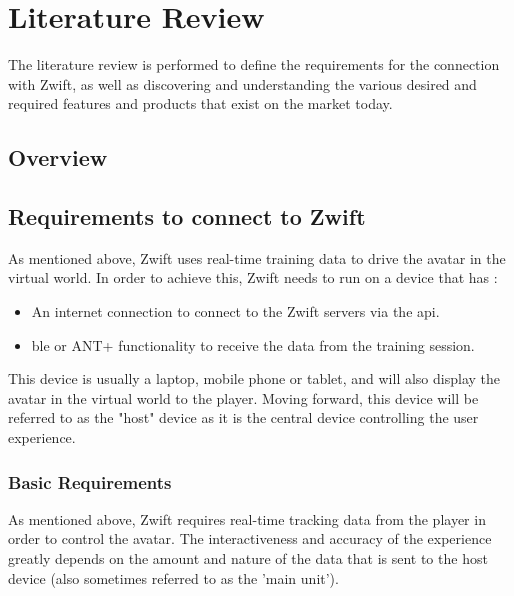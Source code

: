 
\chapter{Literature Review}
The literature review is performed to define the requirements for the connection with Zwift, as well as discovering and understanding the various desired and required features and products that exist on the market today.

\section{Overview}

\newpage

\section{Requirements to connect to Zwift}
As mentioned above, Zwift uses real-time training data to drive the avatar in the virtual world. In order to achieve this, Zwift needs to run on a device that has :

\begin{itemize}
	\item An internet connection to connect to the Zwift servers via the \ac{api}.
	\item \ac{ble} or ANT+ functionality to receive the data from the training session.
\end{itemize}

This device is usually a laptop, mobile phone or tablet, and will also display the avatar in the virtual world to the player. Moving forward, this device will be referred to as the "host" device as it is the central device controlling the user experience. \citep{Bromley:2022}

\subsection{Basic Requirements}
As mentioned above, Zwift requires real-time tracking data from the player in order to control the avatar. The interactiveness and accuracy of the experience greatly depends on the amount and nature of the data that is sent to the host device (also sometimes referred to as the 'main unit').

